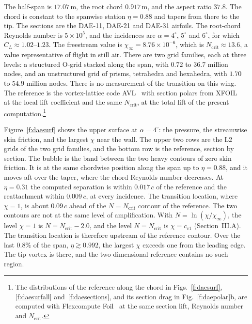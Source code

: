 \documentclass[conf]{new-aiaa}
\begin{document}
The half-span is $17.07\,$m, the root chord $0.917\,$m, and the aspect ratio
$37.8$. The chord is constant to the spanwise station $\eta=0.88$ and tapers
from there to the tip. The sections are the DAE-11, DAE-21 and DAE-31
airfoils. The root-chord Reynolds number is $5\times10^5$, and the incidences
are $\alpha=4^\circ$, $5^\circ$ and $6^\circ$, for which
$C_L\approx1.02$--$1.23$. The freestream value is
$\chi_\infty=8.76\times10^{-6}$, which is $N_\mathrm{crit}\approx13.6$, a
value representative of flight in still air. There are two grid families, each at three
levels: a structured O-grid stacked along the span, with $0.72$ to $36.7$
million nodes, and an unstructured grid of prisms, tetrahedra and hexahedra,
with $1.70$ to $54.9$ million nodes. There is no measurement of the
transition on this wing. The reference is the vortex-lattice code
AVL~\cite{drela_youngren_avl} with section polars from
XFOIL~\cite{drela_xfoil_1989} at the local lift coefficient and the same
$N_\mathrm{crit}$, at the total lift of the present computation.\footnote{The distributions of the reference along the chord in
Figs.~\ref{f:daesurf}, \ref{f:daesurfall} and~\ref{f:daesections}, and its section drag in
Fig.~\ref{f:daepolar}b, are computed with Flexcompute Foil~\cite{smith_flexfoil_2026}
at the same section lift, Reynolds number and $N_\mathrm{crit}$.}

Figure~\ref{f:daesurf} shows the upper surface at $\alpha=4^\circ$: the
pressure, the streamwise skin friction, and the largest $\chi$ near the wall.
The upper two rows are the L2 grids of the two grid families, and the bottom
row is the reference, section by section. The bubble is the band between the two
heavy contours of zero skin friction. It is at the same chordwise position
along the span up to $\eta=0.88$, and it moves aft over the taper, where the
chord Reynolds number decreases. At $\eta=0.31$ the computed separation is
within $0.017\,c$ of the reference and the reattachment within $0.009\,c$, at
every incidence. The transition location, where $\chi=1$, is about $0.09\,c$ ahead of the
$N=N_\mathrm{crit}$ contour of the reference. The two contours are not at
the same level of amplification. With $N=\ln(\chi/\chi_\infty)$, the level
$\chi=1$ is $N=N_\mathrm{crit}-2.0$, and the level $N=N_\mathrm{crit}$ is
$\chi=c_{v1}$ (Section~III.A). The transition location is therefore upstream of the
reference contour. Over the
last $0.8\%$ of the span, $\eta\gtrsim0.992$, the largest $\chi$ exceeds one
from the leading edge. The tip vortex is there, and the two-dimensional
reference contains no such region.
\end{document}
